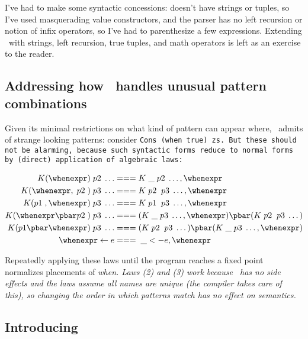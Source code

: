 \documentclass[manuscript,screen,review, 12pt, nonacm]{acmart}
\begin{document}
    I've had to make some syntactic concessions: \PPlus doesn't have strings or
    tuples, so I've used masquerading value constructors, and the parser has no
    left recursion or notion of infix operators, so I've had to parenthesize a
    few expressions. Extending \PPlus\ with strings, left recursion, true
    tuples, and math operators is left as an exercise to the reader. 
    
\subsection{Addressing how \PPlus\ handles unusual pattern combinations}
    Given its minimal restrictions on what kind of pattern can appear where,
    \PPlus\ admits of strange looking patterns: consider \tt{Cons (when true)
    zs}. But these should not be alarming, because such syntactic forms reduce
    to normal forms by (direct) application of algebraic laws: 

    \begin{align}
      K (\whenexpr) \;p2\; \dots &=== K \;\_ \;p2\; \dots, \whenexpr \\
      K (\whenexpr, \;p2\;) \;p3\; \dots  &=== K \;p2\; \;p3\; \dots, \whenexpr \\
      K (p1\;, \whenexpr) \;p3\; \dots  &=== K \;p1\; \;p3\; \dots, \whenexpr \\
      K (\whenexpr \pbar p2\;) \;p3\; \dots &=== (K \;\_ \;p3\; \dots, \whenexpr) \pbar (K \;p2\; \;p3\; \dots) \\
      K (p1 \pbar \whenexpr) \;p3\; \dots &=== (K \;p2\; \;p3\; \dots) \pbar (K \;\_ \;p3\; \dots, \whenexpr)  \\
      \whenexpr \leftarrow e &=== \;\_ <- e, \whenexpr
    \end{align}
    
    
    Repeatedly applying these laws until the program reaches a fixed point
    normalizes placements of \it{when}. Laws (2) and (3) work because \PPlus\
    has no side effects and the laws assume all names are unique (the compiler
    takes care of this), so changing the order in which patterns match has no
    effect on semantics.         


\subsection{Introducing \VMinus\ }
\end{document}
